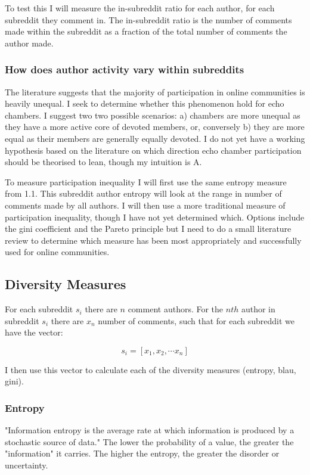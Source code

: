 \documentclass{article}
\begin{document}
To test this I will measure the in-subreddit ratio for each author, for each subreddit they comment in. The in-subreddit ratio is the number of comments made within the subreddit as a fraction of the total number of comments the author made.

\subsubsection{How does author activity vary within subreddits}

The literature suggests that the majority of participation in online communities is heavily unequal. I seek to determine whether this phenomenon hold for echo chambers. I suggest two two possible scenarios: a) chambers are more unequal as they have a more active core of devoted members, or, conversely b) they are more equal as their members are generally equally devoted. I do not yet have a working hypothesis based on the literature on which direction echo chamber participation should be theorised to lean, though my intuition is A.

To measure participation inequality I will first use the same entropy measure from 1.1. This subreddit author entropy will look at the range in number of comments made by all authors. I will then use a more traditional measure of participation inequality, though I have not yet determined which. Options include the gini coefficient and the Pareto principle but I need to do a small literature review to determine which measure has been most appropriately and successfully used for online communities.


\subsection{Diversity Measures} \label{subreddit vector}
For each subreddit $s_i$ there are $n$ comment authors. For the $nth$ author in subreddit $s_i$ there are $x_n$ number of comments, such that for each subreddit we have the vector:

$$s_i = [x_1, x_2, \cdots x_n]$$

I then use this vector to calculate each of the diversity measures (entropy, blau, gini).


\subsubsection{Entropy} \label{entropy}

"Information entropy is the average rate at which information is produced by a stochastic source of data." The lower the probability of a value, the greater the "information" it carries. The higher the entropy, the greater the disorder or uncertainty.
\end{document}
